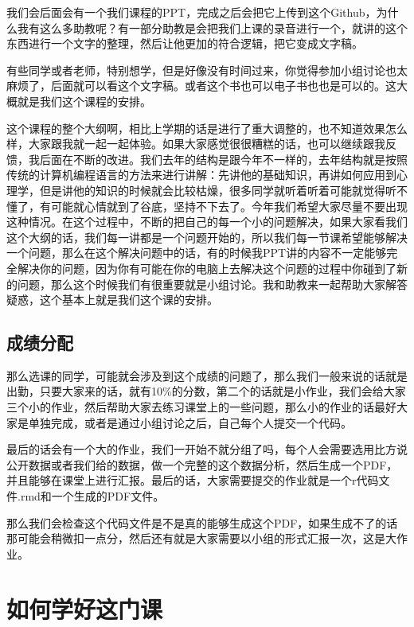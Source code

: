 \documentclass[
  oneside]{book}
\begin{document}
我们会后面会有一个我们课程的PPT，完成之后会把它上传到这个Github，为什么我有这么多助教呢？有一部分助教是会把我们上课的录音进行一个，就讲的这个东西进行一个文字的整理，然后让他更加的符合逻辑，把它变成文字稿。

有些同学或者老师，特别想学，但是好像没有时间过来，你觉得参加小组讨论也太麻烦了，后面就可以看这个文字稿。或者这个书也可以电子书也也是可以的。这大概就是我们这个课程的安排。

这个课程的整个大纲啊，相比上学期的话是进行了重大调整的，也不知道效果怎么样，大家跟我就一起一起体验。如果大家感觉很很糟糕的话，也可以继续跟我反馈，我后面在不断的改进。我们去年的结构是跟今年不一样的，去年结构就是按照传统的计算机编程语言的方法来进行讲解：先讲他的基础知识，再讲如何应用到心理学，但是讲他的知识的时候就会比较枯燥，很多同学就听着听着可能就觉得听不懂了，有可能就心情就到了谷底，坚持不下去了。今年我们希望大家尽量不要出现这种情况。在这个过程中，不断的把自己的每一个小的问题解决，如果大家看我们这个大纲的话，我们每一讲都是一个问题开始的，所以我们每一节课希望能够解决一个问题，那么在这个解决问题中的话，有的时候我PPT讲的内容不一定能够完全解决你的问题，因为你有可能在你的电脑上去解决这个问题的过程中你碰到了新的问题，那么这个时候我们有很重要就是小组讨论。我和助教来一起帮助大家解答疑惑，这个基本上就是我们这个课的安排。

\hypertarget{ux6210ux7ee9ux5206ux914d}{%
\subsection{成绩分配}\label{ux6210ux7ee9ux5206ux914d}}

那么选课的同学，可能就会涉及到这个成绩的问题了，那么我们一般来说的话就是出勤，只要大家来的话，就有10\%的分数，第二个的话就是小作业，我们会给大家三个小的作业，然后帮助大家去练习课堂上的一些问题，那么小的作业的话最好大家是单独完成，或者是通过小组讨论之后，自己每个人提交一个代码。

最后的话会有一个大的作业，我们一开始不就分组了吗，每个人会需要选用比方说公开数据或者我们给的数据，做一个完整的这个数据分析，然后生成一个PDF，并且能够在课堂上进行汇报。最后的话，大家需要提交的作业就是一个r代码文件.rmd和一个生成的PDF文件。

那么我们会检查这个代码文件是不是真的能够生成这个PDF，如果生成不了的话那可能会稍微扣一点分，然后还有就是大家需要以小组的形式汇报一次，这是大作业。

\hypertarget{ux5982ux4f55ux5b66ux597dux8fd9ux95e8ux8bfe}{%
\section{如何学好这门课}\label{ux5982ux4f55ux5b66ux597dux8fd9ux95e8ux8bfe}}
\end{document}
